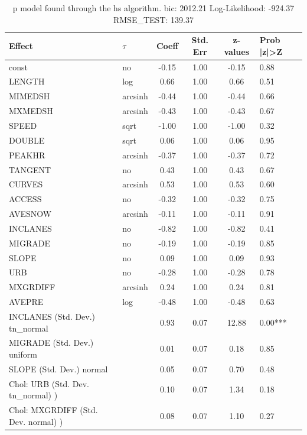 \begin{table}
	\caption{p model found through the hs algorithm. bic: 2012.21 Log-Likelihood: -924.37 RMSE_TEST: 139.37}
	\begin{center}
		\begin{tabular}{|l|l|c|c|c|l|}
			\hline
			Effect & $\tau$ & Coeff & Std. Err & z-values & Prob |z|>Z \\
			\hline
			const & no & -0.15 & 1.00 & -0.15 & 0.88 \\
			\hline
			LENGTH & log & 0.66 & 1.00 & 0.66 & 0.51 \\
			\hline
			MIMEDSH & arcsinh & -0.44 & 1.00 & -0.44 & 0.66 \\
			\hline
			MXMEDSH & arcsinh & -0.43 & 1.00 & -0.43 & 0.67 \\
			\hline
			SPEED & sqrt & -1.00 & 1.00 & -1.00 & 0.32 \\
			\hline
			DOUBLE & sqrt & 0.06 & 1.00 & 0.06 & 0.95 \\
			\hline
			PEAKHR & arcsinh & -0.37 & 1.00 & -0.37 & 0.72 \\
			\hline
			TANGENT & no & 0.43 & 1.00 & 0.43 & 0.67 \\
			\hline
			CURVES & arcsinh & 0.53 & 1.00 & 0.53 & 0.60 \\
			\hline
			ACCESS & no & -0.32 & 1.00 & -0.32 & 0.75 \\
			\hline
			AVESNOW & arcsinh & -0.11 & 1.00 & -0.11 & 0.91 \\
			\hline
			INCLANES & no & -0.82 & 1.00 & -0.82 & 0.41 \\
			\hline
			MIGRADE & no & -0.19 & 1.00 & -0.19 & 0.85 \\
			\hline
			SLOPE & no & 0.09 & 1.00 & 0.09 & 0.93 \\
			\hline
			URB & no & -0.28 & 1.00 & -0.28 & 0.78 \\
			\hline
			MXGRDIFF & arcsinh & 0.24 & 1.00 & 0.24 & 0.81 \\
			\hline
			AVEPRE & log & -0.48 & 1.00 & -0.48 & 0.63 \\
			\hline
			INCLANES (Std. Dev.) tn_normal &  & 0.93 & 0.07 & 12.88 & 0.00*** \\
			\hline
			MIGRADE (Std. Dev.) uniform &  & 0.01 & 0.07 & 0.18 & 0.85 \\
			\hline
			SLOPE (Std. Dev.) normal &  & 0.05 & 0.07 & 0.70 & 0.48 \\
			\hline
			 Chol: URB (Std. Dev. tn_normal) ) &  & 0.10 & 0.07 & 1.34 & 0.18 \\
			\hline
			 Chol: MXGRDIFF (Std. Dev. normal) ) &  & 0.08 & 0.07 & 1.10 & 0.27 \\

\end{tabular}
\end{center}
\end{table}
